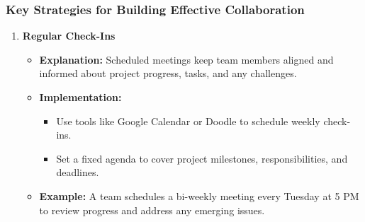 \documentclass[aspectratio=169]{beamer}
\begin{document}
\begin{frame}[fragile]
    \frametitle{Key Strategies for Building Effective Collaboration}
    \begin{enumerate}
        \item \textbf{Regular Check-Ins}
        \begin{itemize}
            \item \textbf{Explanation:} Scheduled meetings keep team members aligned and informed about project progress, tasks, and any challenges.
            \item \textbf{Implementation:}
            \begin{itemize}
                \item Use tools like Google Calendar or Doodle to schedule weekly check-ins.
                \item Set a fixed agenda to cover project milestones, responsibilities, and deadlines.
            \end{itemize}
            \item \textbf{Example:} A team schedules a bi-weekly meeting every Tuesday at 5 PM to review progress and address any emerging issues.
        \end{itemize}
    \end{enumerate}
\end{frame}
\end{document}
